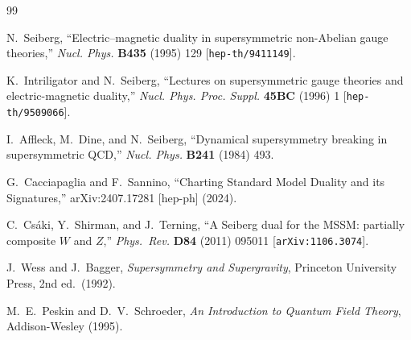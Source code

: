 \documentclass[11pt,a4paper]{article}
\begin{document}
\begin{thebibliography}{99}

  N.~Seiberg,
  ``Electric--magnetic duality in supersymmetric non-Abelian gauge theories,''
  \textit{Nucl. Phys.} \textbf{B435} (1995) 129
  [\texttt{hep-th/9411149}].

  K.~Intriligator and N.~Seiberg,
  ``Lectures on supersymmetric gauge theories and electric-magnetic duality,''
  \textit{Nucl. Phys. Proc. Suppl.} \textbf{45BC} (1996) 1
  [\texttt{hep-th/9509066}].

  I.~Affleck, M.~Dine, and N.~Seiberg,
  ``Dynamical supersymmetry breaking in supersymmetric QCD,''
  \textit{Nucl. Phys.} \textbf{B241} (1984) 493.

  G.~Cacciapaglia and F.~Sannino,
  ``Charting Standard Model Duality and its Signatures,''
  arXiv:2407.17281 [hep-ph] (2024).

  C.~Cs\'aki, Y.~Shirman, and J.~Terning,
  ``A Seiberg dual for the MSSM: partially composite $W$ and $Z$,''
  \textit{Phys.~Rev.} \textbf{D84} (2011) 095011
  [\texttt{arXiv:1106.3074}].

  J.~Wess and J.~Bagger,
  \textit{Supersymmetry and Supergravity},
  Princeton University Press, 2nd ed.\ (1992).

  M.~E.~Peskin and D.~V.~Schroeder,
  \textit{An Introduction to Quantum Field Theory},
  Addison-Wesley (1995).

\end{thebibliography}
\end{document}
